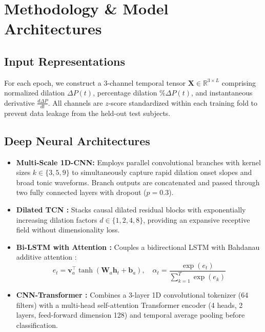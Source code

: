 \documentclass[journal]{IEEEtran}
\begin{document}
\section{Methodology \& Model Architectures}

\subsection{Input Representations}
For each epoch, we construct a 3-channel temporal tensor $\mathbf{X} \in \mathbb{R}^{3 \times L}$ comprising normalized dilation $\Delta P(t)$, percentage dilation $\%\Delta P(t)$, and instantaneous derivative $\frac{d\Delta P}{dt}$. All channels are $z$-score standardized within each training fold to prevent data leakage from the held-out test subjects.

\subsection{Deep Neural Architectures}
\begin{itemize}
    \item \textbf{Multi-Scale 1D-CNN:} Employs parallel convolutional branches with kernel sizes $k \in \{3, 5, 9\}$ to simultaneously capture rapid dilation onset slopes and broad tonic waveforms. Branch outputs are concatenated and passed through two fully connected layers with dropout ($p = 0.3$).
    \item \textbf{Dilated TCN \cite{bai2018empirical}:} Stacks causal dilated residual blocks with exponentially increasing dilation factors $d \in \{1, 2, 4, 8\}$, providing an expansive receptive field without dimensionality loss.
    \item \textbf{Bi-LSTM with Attention \cite{hochreiter1997long}:} Couples a bidirectional LSTM with Bahdanau additive attention \cite{bahdanau2015neural}:
    \begin{equation}
        e_t = \mathbf{v}_a^\top \tanh(\mathbf{W}_a \mathbf{h}_t + \mathbf{b}_a), \quad \alpha_t = \frac{\exp(e_t)}{\sum_{k=1}^T \exp(e_k)}
    \end{equation}
    \item \textbf{CNN-Transformer \cite{vaswani2017attention}:} Combines a 3-layer 1D convolutional tokenizer (64 filters) with a multi-head self-attention Transformer encoder (4 heads, 2 layers, feed-forward dimension 128) and temporal average pooling before classification.
\end{itemize}
\end{document}
